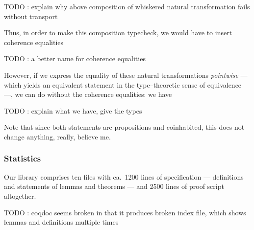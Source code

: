 TODO : explain why above composition of whiskered natural transformation fails without transport

Thus, in order to make this composition typecheck, we would have to insert coherence equalities

TODO : a better name for coherence equalities

However, if we express the equality of these natural transformations \emph{pointwise} --- which yields an equivalent statement
in the type--theoretic sense of equivalence ---, we can do without the coherence equalities: we have

TODO : explain what we have, give the types


Note that since both statements are propositions and coinhabited, this does not change anything, really, believe me.


\subsubsection*{Statistics}

Our library comprises ten files with ca.\ 1200 lines of specification --- definitions and statements of lemmas and theorems ---
and 2500 lines of proof script altogether.


TODO : coqdoc seems broken in that it produces broken index file, which shows lemmas and definitions multiple times


%



